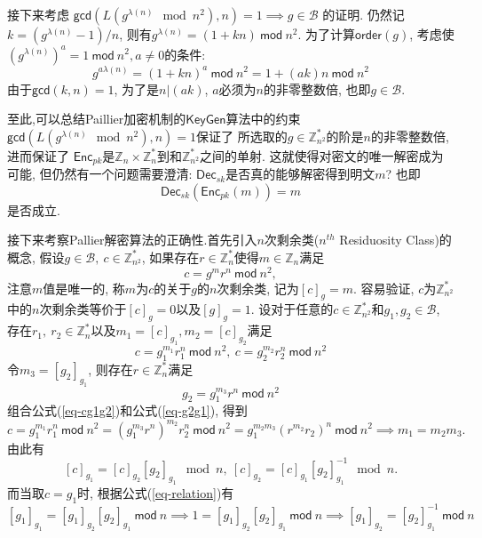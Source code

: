 \documentclass{article}
\newcommand{\Z}{\mathbb{Z}}
\begin{document}
接下来考虑
$\textsf{gcd}\left(L\left(g^{\lambda(n)} \mod n^2\right), n\right) = 1 \implies g\in \mathcal{B}$
的证明. 仍然记$k = \left(g^{\lambda(n)} - 1\right)/n$, 
则有$g^{\lambda(n)} = (1 + kn)~\textsf{mod}~n^2$.
为了计算$\textsf{order}(g)$, 
考虑使$\left(g^{\lambda(n)}\right)^a  = 1~\textsf{mod}~n^2, a\neq 0$的条件:
$$
g^{a\lambda(n)} = (1 + kn)^a~\textsf{mod}~n^2 = 1 + (ak)n ~\textsf{mod}~n^2 
$$
由于$\textsf{gcd}(k, n)= 1$, 为了是$n | (ak)$, $a$必须为$n$的非零整数倍, 也即$g \in \mathcal{B}$.

至此,可以总结Paillier加密机制的$\textsf{KeyGen}$算法中的约束
$\textsf{gcd}\left(L\left(g^{\lambda(n)} \mod n^2\right), n\right) = 1$保证了
所选取的$g\in\Z_{n^2}^*$的阶是$n$的非零整数倍, 进而保证了
$\textsf{Enc}_{pk}$是$\Z_n\times\Z_n^*$到和$\Z_{n^2}^*$之间的单射.
这就使得对密文的唯一解密成为可能, 但仍然有一个问题需要澄清:
$\textsf{Dec}_{sk}$是否真的能够解密得到明文$m$? 也即
$$
\textsf{Dec}_{sk}\left(\textsf{Enc}_{pk}(m)\right) = m
$$
是否成立. 

接下来考察Pallier解密算法的正确性.首先引入$n$次剩余类($n^{th}$ Residuosity Class)的概念,
假设$g\in\mathcal{B},\ c\in\Z_{n^2}^*$, 如果存在$r\in\Z_{n}^*$使得$m \in \Z_n$满足
$$
c = g^mr^n~\textsf{mod}~n^2,
$$
注意$m$值是唯一的, 称$m$为$c$的关于$g$的$n$次剩余类, 记为$[c]_g = m$.
容易验证, $c$为$\Z_{n^2}^*$中的$n$次剩余类等价于$[c]_g = 0$以及$[g]_g  = 1$.
设对于任意的$c\in\Z_{n^2}^*$和$g_1, g_2 \in \mathcal{B}$, 
存在$r_1,\ r_2 \in \Z_n^*$以及$m_1 = [c]_{g_1}, m_2 = [c]_{g_2}$满足
\begin{equation}\label{eq-cg1g2}
c = g_1^{m_1}r_1^n ~\textsf{mod}~ n^2, \ 
c = g_2^{m_2}r_2^n ~\textsf{mod}~ n^2  
\end{equation}
令$m_3 = [g_2]_{g_1}$, 则存在$r\in\Z_n^*$满足
\begin{equation}\label{eq-g2g1}
g_2 = g_1^{m_3}r^{n}~\textsf{mod}~n^2
\end{equation}
组合公式(\ref{eq-cg1g2})和公式(\ref{eq-g2g1}), 得到
$$
c = g_1^{m_1}r_1^n ~\textsf{mod}~ n^2 = 
\left(g_1^{m_3}r^{n}\right)^{m_2}r_2^{n}~\textsf{mod}~n^2 = 
g_1^{m_2m_3}\left(r^{m_2}r_2\right)^n~\textsf{mod}~n^2 
\implies  m_1 = m_2m_3.
$$
由此有
\begin{equation}\label{eq-relation}
[c]_{g_1} = [c]_{g_2}[g_2]_{g_1} \mod n,\ [c]_{g_2} = [c]_{g_1}[g_2]_{g_1}^{-1} \mod n.
\end{equation}
而当取$c = g_1$时, 根据公式(\ref{eq-relation})有
\begin{equation}\label{eq-relation2}
[g_1]_{g_1} = [g_1]_{g_2}[g_2]_{g_1} ~\textsf{mod}~ n 
\implies 1 =  [g_1]_{g_2}[g_2]_{g_1} ~\textsf{mod}~ n 
\implies [g_1]_{g_2} = [g_2]_{g_1}^{-1} ~\textsf{mod}~ n 
\end{equation}
\end{document}
